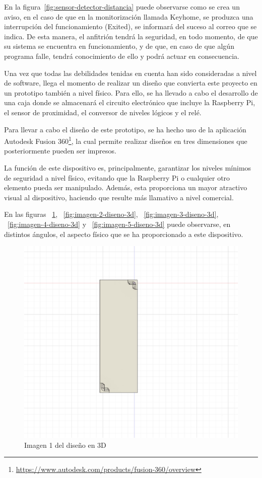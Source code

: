 En la figura~\ref{fig:sensor-detector-distancia} puede observarse como se crea un aviso, en el caso de que en la monitorización llamada Keyhome, se produzca una interrupción del funcionamiento (Exited), se informará del suceso al correo que se indica. De esta manera, el anfitrión tendrá la seguridad, en todo momento, de que su sistema se encuentra en funcionamiento, y de que, en caso de que algún programa falle, tendrá conocimiento de ello y podrá actuar en consecuencia.

Una vez que todas las debilidades tenidas en cuenta han sido consideradas a nivel de software, llega el momento de realizar un diseño que convierta este proyecto en un prototipo también a nivel físico. Para ello, se ha llevado a cabo el desarrollo de una caja donde se almacenará el circuito electrónico que incluye la Raspberry Pi, el sensor de proximidad, el conversor de niveles lógicos y el relé.

Para llevar a cabo el diseño de este prototipo, se ha hecho uso de la aplicación Autodesk Fusion 360\footnote{\url{https://www.autodesk.com/products/fusion-360/overview}}, la cual permite realizar diseños en tres dimensiones que posteriormente pueden ser impresos.

La función de este dispositivo es, principalmente, garantizar los niveles mínimos de seguridad a nivel físico, evitando que la Raspberry Pi o cualquier otro elemento pueda ser manipulado. Además, esta proporciona un mayor atractivo visual al dispositivo, haciendo que resulte más llamativo a nivel comercial.

En las figuras ~\ref{fig:imagen-1-diseno-3d}, ~\ref{fig:imagen-2-diseno-3d}, ~\ref{fig:imagen-3-diseno-3d}, ~\ref{fig:imagen-4-diseno-3d} y ~\ref{fig:imagen-5-diseno-3d} puede observarse, en distintos ángulos, el aspecto físico que se ha proporcionado a este dispositivo.

\begin{figure}[tbp]
\centering
\includegraphics[scale = 0.2]{fig/Imagen_1_diseno_3D.jpeg}
\caption{Imagen 1 del diseño en 3D}
\label{fig:imagen-1-diseno-3d}
\end{figure}

